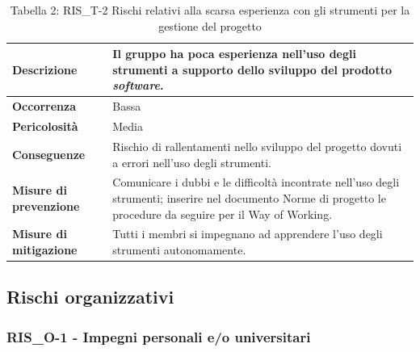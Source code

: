 \documentclass[a4paper,10pt]{article}
\begin{document}
\begin{table}[H]
\centering
\renewcommand{\arraystretch}{1.3}

\begin{tabularx}{\textwidth}{|p{4cm}|X|}
\hline
\textbf{Descrizione} & 
Il gruppo ha poca esperienza nell’uso degli strumenti a supporto dello sviluppo del prodotto \textit{software}. \\ \hline

\textbf{Occorrenza} & Bassa \\ \hline

\textbf{Pericolosità} & Media \\ \hline

\textbf{Conseguenze} & 
Rischio di rallentamenti nello sviluppo del progetto dovuti a errori nell'uso degli strumenti. \\ \hline

\textbf{Misure di prevenzione} & Comunicare i dubbi e le difficoltà incontrate nell’uso degli strumenti; inserire nel documento Norme di progetto le procedure da seguire per il Way of Working. \\ \hline

\textbf{Misure di mitigazione} &
Tutti i membri si impegnano ad apprendere l’uso degli strumenti autonomamente. \\ \hline

\end{tabularx}

\caption{Tabella 2: RIS\_T-2 Rischi relativi alla scarsa esperienza con gli strumenti per la gestione del progetto}
\end{table}

\subsection{Rischi organizzativi}
\subsubsection{RIS\_O-1 - Impegni personali e/o universitari}
\end{document}
